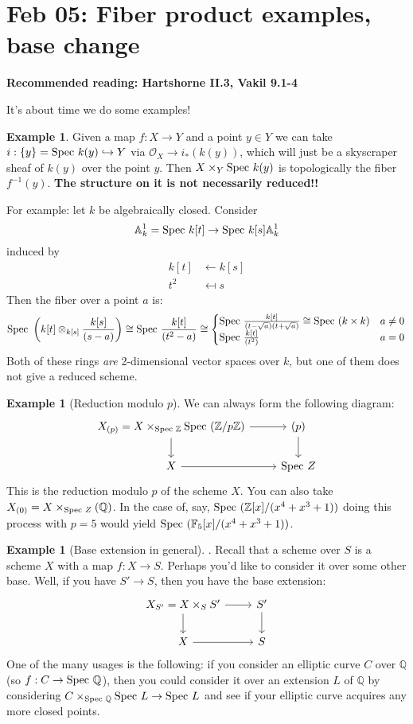 \documentclass[10pt,reqno]{amsart}
\theoremstyle{definition}
\newtheorem{example}[theorem]{Example}
\theoremstyle{remark}
\numberwithin{equation}{section}
\numberwithin{theorem}{section}
\newcommand{\Z}{{\mathbb Z}}
\newcommand{\OO}{{\mathcal O}}
\newcommand{\Q}{{\mathbb Q}}
\newcommand{\spec}{\textup{Spec }}
\begin{document}
\section{Feb 05: Fiber product examples, base change}
\textbf{Recommended reading: Hartshorne II.3, Vakil 9.1-4}

It's about time we do some examples!

\begin{example} Given a map $f: X \to Y$ and a point $y \in Y$ we can take $i: \{y\} = \spec k(y) \hookrightarrow Y$ via $\OO_{X} \to i_*(k(y))$, which will just be a skyscraper sheaf of $k(y)$ over the point $y$. Then $X \times_Y \spec k(y)$ is topologically the fiber $f^{-1}(y)$. \textbf{The structure on it is not necessarily reduced!!}

For example: let $k$ be algebraically closed. Consider
\[\mathbb{A}^1_k = \spec k[t] \to \spec k[s] \mathbb{A}^1_k\]
induced by 
\begin{align*}
k[t] &\leftarrow k[s]\\
 t^2 &\mapsfrom s
\end{align*}
Then the fiber over a point $a$ is:
\[\spec \left(k[t] \otimes_{k[s]} \frac{k[s]}{(s-a)}\right) \cong \spec \frac{k[t]}{(t^2-a)} \cong 
\begin{cases}
\spec \frac{k[t]}{(t-\sqrt{a})(t+\sqrt{a})} \cong \spec (k \times k) & a \ne 0\\
\spec \frac{k[t]}{(t^2)} & a = 0
\end{cases}\]
Both of these rings \textit{are} 2-dimensional vector spaces over $k$, but one of them does not give a reduced scheme.
\end{example}

\begin{example}[Reduction modulo $p$] We can always form the following diagram:
\[\begin{tikzcd}
X_{(p)} = X \times_{\spec \Z} \spec(\Z/p\Z) \arrow[r] \arrow[d]& (p) \arrow[d]\\
X \arrow[r] & \spec Z
\end{tikzcd}\]
This is the reduction modulo $p$ of the scheme $X$. You can also take $X_{(0)} = X \times_{\spec Z} (\Q)$. In the case of, say, $\spec (\Z[x]/(x^4 + x^3 + 1))$ doing this process with $p=5$ would yield ${\spec (\mathbb{F}_5[x]/(x^4+x^3+1))}$.
\end{example}

\begin{example}[Base extension in general]. Recall that a scheme over $S$ is a scheme $X$ with a map $f: X \to S$. Perhaps you'd like to consider it over some other base. Well, if you have $S' \to S$, then you have the base extension:
\[
\begin{tikzcd}
X_{S'} = X \times_S S' \arrow[r] \arrow[d]& S' \arrow[d]\\
X \arrow[r]& S
\end{tikzcd}
\]
One of the many usages is the following: if you consider an elliptic curve $C$ over $\Q$ (so $f: C \to \spec \Q$), then you could consider it over an extension $L$ of $\Q$ by considering $C \times_{\spec \Q} \spec L \to \spec L$ and see if your elliptic curve acquires any more closed points. 
\end{example}
\end{document}
